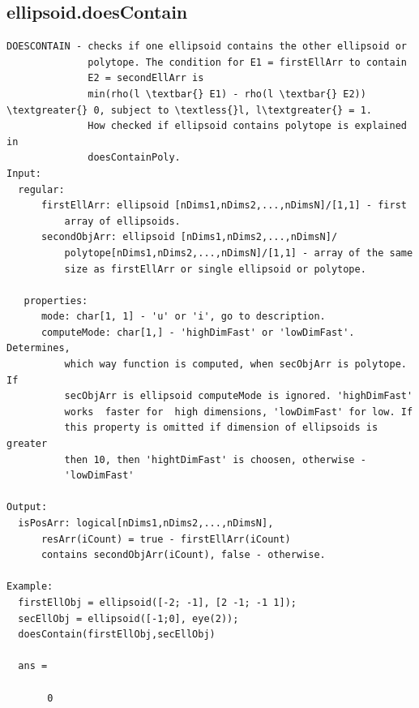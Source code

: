 \documentclass[letterpaper,10pt,english]{sphinxmanual}
\begin{document}
\subsection{ellipsoid.doesContain}
\label{chap_functions:ellipsoid-doescontain}
\begin{Verbatim}[commandchars=\\\{\}]
DOESCONTAIN - checks if one ellipsoid contains the other ellipsoid or
              polytope. The condition for E1 = firstEllArr to contain
              E2 = secondEllArr is
              min(rho(l \textbar{} E1) - rho(l \textbar{} E2)) \textgreater{} 0, subject to \textless{}l, l\textgreater{} = 1.
              How checked if ellipsoid contains polytope is explained in
              doesContainPoly.
Input:
  regular:
      firstEllArr: ellipsoid [nDims1,nDims2,...,nDimsN]/[1,1] - first
          array of ellipsoids.
      secondObjArr: ellipsoid [nDims1,nDims2,...,nDimsN]/
          polytope[nDims1,nDims2,...,nDimsN]/[1,1] - array of the same
          size as firstEllArr or single ellipsoid or polytope.

   properties:
      mode: char[1, 1] - 'u' or 'i', go to description.
      computeMode: char[1,] - 'highDimFast' or 'lowDimFast'. Determines,
          which way function is computed, when secObjArr is polytope. If
          secObjArr is ellipsoid computeMode is ignored. 'highDimFast'
          works  faster for  high dimensions, 'lowDimFast' for low. If
          this property is omitted if dimension of ellipsoids is greater
          then 10, then 'hightDimFast' is choosen, otherwise -
          'lowDimFast'

Output:
  isPosArr: logical[nDims1,nDims2,...,nDimsN],
      resArr(iCount) = true - firstEllArr(iCount)
      contains secondObjArr(iCount), false - otherwise.

Example:
  firstEllObj = ellipsoid([-2; -1], [2 -1; -1 1]);
  secEllObj = ellipsoid([-1;0], eye(2));
  doesContain(firstEllObj,secEllObj)

  ans =

       0
\end{Verbatim}
\end{document}

